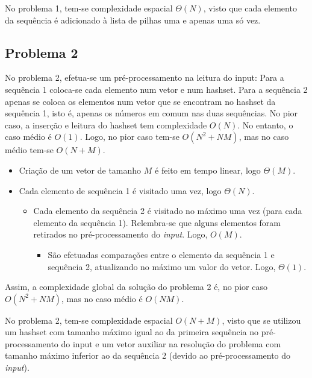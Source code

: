 \documentclass[12pt,a4paper]{article}
\begin{document}
  No problema 1, tem-se complexidade espacial $\Theta(N)$, visto que cada elemento da sequência é adicionado à lista de pilhas uma e apenas uma só vez.

  \subsection{Problema 2}

  No problema 2, efetua-se um pré-processamento na leitura do input:
    Para a sequência 1 coloca-se cada elemento num vetor e num hashset.
    Para a sequência 2 apenas se coloca os elementos num vetor que se encontram no hashset da sequência 1, isto é, apenas os números em comum nas duas sequências.
  No pior caso, a inserção e leitura do hashset tem complexidade $O(N)$.
  No entanto, o caso médio é $O(1)$.
  Logo, no pior caso tem-se $O(N^2 + NM)$, mas no caso médio tem-se $O(N + M)$.

  \begin{itemize}
    \setlength{\itemsep}{0pt}
    \item Criação de um vetor de tamanho $M$ é feito em tempo linear, logo $\Theta(M)$.
    \item Cada elemento de sequência 1 é visitado uma vez, logo $\Theta(N)$.
    \begin{itemize}
      \setlength{\itemsep}{0pt}
      \item Cada elemento da sequência 2 é visitado no máximo uma vez (para cada elemento da sequência 1). Relembra-se que alguns elementos foram retirados no pré-processamento do \textit{input}. Logo, $O(M)$.
      \begin{itemize}
        \setlength{\itemsep}{0pt}
        \item São efetuadas comparações entre o elemento da sequência 1 e sequência 2, atualizando no máximo um valor do vetor. Logo, $\Theta(1)$.
      \end{itemize}
    \end{itemize}
  \end{itemize}

  Assim, a complexidade global da solução do problema 2 é, no pior caso $O(N^2 + NM)$, mas no caso médio é $O(NM)$.

  No problema 2, tem-se complexidade espacial $O(N + M)$, visto que se utilizou um hashset com tamanho máximo igual ao da primeira sequência no pré-processamento do input e um vetor auxiliar na resolução do problema com tamanho máximo inferior ao da sequência 2 (devido ao pré-processamento do \textit{input}).
\end{document}
